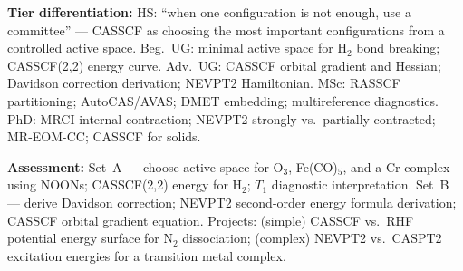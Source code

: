 \documentclass[11pt,a4paper]{article}
\begin{document}
\begin{tcolorbox}[modulebox, title={Module~II.1 --- Lecture L10: Multi-Reference Methods}]
\medskip\textbf{Tier differentiation:}
HS: ``when one configuration is not enough, use a committee'' ---
CASSCF as choosing the most important configurations from a controlled active space.
Beg.\ UG: minimal active space for H$_2$ bond breaking; CASSCF(2,2) energy curve.
Adv.\ UG: CASSCF orbital gradient and Hessian; Davidson correction derivation; NEVPT2 Hamiltonian.
MSc: RASSCF partitioning; AutoCAS/AVAS; DMET embedding; multireference diagnostics.
PhD: MRCI internal contraction; NEVPT2 strongly vs.\ partially contracted; MR-EOM-CC;
CASSCF for solids.

\medskip\textbf{Assessment:}
Set~A --- choose active space for O$_3$, Fe(CO)$_5$, and a Cr complex using NOONs;
CASSCF(2,2) energy for H$_2$; $T_1$ diagnostic interpretation.
Set~B --- derive Davidson correction; NEVPT2 second-order energy formula derivation;
CASSCF orbital gradient equation.
Projects: (simple) CASSCF vs.\ RHF potential energy surface for N$_2$ dissociation;
(complex) NEVPT2 vs.\ CASPT2 excitation energies for a transition metal complex.
\end{tcolorbox}

\medskip
\end{document}

